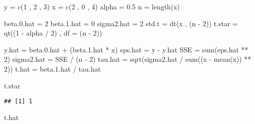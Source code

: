 \documentclass[
]{article}
\newenvironment{Shaded}{\begin{snugshade}}{\end{snugshade}}
\newcommand{\AttributeTok}[1]{\textcolor[rgb]{0.77,0.63,0.00}{#1}}
\newcommand{\DecValTok}[1]{\textcolor[rgb]{0.00,0.00,0.81}{#1}}
\newcommand{\FloatTok}[1]{\textcolor[rgb]{0.00,0.00,0.81}{#1}}
\newcommand{\FunctionTok}[1]{\textcolor[rgb]{0.00,0.00,0.00}{#1}}
\newcommand{\NormalTok}[1]{#1}
\newcommand{\OtherTok}[1]{\textcolor[rgb]{0.56,0.35,0.01}{#1}}
\newcommand{\SpecialCharTok}[1]{\textcolor[rgb]{0.00,0.00,0.00}{#1}}
\begin{document}
\begin{Shaded}
\begin{Highlighting}[]
\NormalTok{y }\OtherTok{=} \FunctionTok{c}\NormalTok{(}\DecValTok{1}\NormalTok{ , }\DecValTok{2}\NormalTok{ , }\DecValTok{3}\NormalTok{)}
\NormalTok{x }\OtherTok{=} \FunctionTok{c}\NormalTok{(}\DecValTok{2}\NormalTok{ , }\DecValTok{0}\NormalTok{ , }\DecValTok{4}\NormalTok{)}
\NormalTok{alpha }\OtherTok{=} \FloatTok{0.5}
\NormalTok{n }\OtherTok{=} \FunctionTok{length}\NormalTok{(x)}

\NormalTok{beta.}\FloatTok{0.}\NormalTok{hat }\OtherTok{=} \DecValTok{2}
\NormalTok{beta.}\FloatTok{1.}\NormalTok{hat }\OtherTok{=} \DecValTok{0}
\NormalTok{sigma2.hat }\OtherTok{=} \DecValTok{2}
\NormalTok{std.t }\OtherTok{=} \FunctionTok{dt}\NormalTok{(x , (n }\SpecialCharTok{{-}} \DecValTok{2}\NormalTok{))}
\NormalTok{t.star }\OtherTok{=} \FunctionTok{qt}\NormalTok{((}\DecValTok{1} \SpecialCharTok{{-}}\NormalTok{ alpha }\SpecialCharTok{/} \DecValTok{2}\NormalTok{) , }\AttributeTok{df =}\NormalTok{ (n }\SpecialCharTok{{-}} \DecValTok{2}\NormalTok{))}

\NormalTok{y.hat }\OtherTok{=}\NormalTok{ beta.}\FloatTok{0.}\NormalTok{hat }\SpecialCharTok{+}\NormalTok{ (beta.}\FloatTok{1.}\NormalTok{hat }\SpecialCharTok{*}\NormalTok{ x)}
\NormalTok{eps.hat }\OtherTok{=}\NormalTok{ y }\SpecialCharTok{{-}}\NormalTok{ y.hat}
\NormalTok{SSE }\OtherTok{=} \FunctionTok{sum}\NormalTok{(eps.hat }\SpecialCharTok{**} \DecValTok{2}\NormalTok{)}
\NormalTok{sigma2.hat }\OtherTok{=}\NormalTok{ SSE }\SpecialCharTok{/}\NormalTok{ (n }\SpecialCharTok{{-}} \DecValTok{2}\NormalTok{)}
\NormalTok{tau.hat }\OtherTok{=} \FunctionTok{sqrt}\NormalTok{(sigma2.hat }\SpecialCharTok{/} \FunctionTok{sum}\NormalTok{((x }\SpecialCharTok{{-}} \FunctionTok{mean}\NormalTok{(x)) }\SpecialCharTok{**} \DecValTok{2}\NormalTok{))}
\NormalTok{t.hat }\OtherTok{=}\NormalTok{ beta.}\FloatTok{1.}\NormalTok{hat }\SpecialCharTok{/}\NormalTok{ tau.hat}

\NormalTok{t.star}
\end{Highlighting}
\end{Shaded}

\begin{verbatim}
## [1] 1
\end{verbatim}

\begin{Shaded}
\begin{Highlighting}[]
\NormalTok{t.hat}
\end{Highlighting}
\end{Shaded}
\end{document}
